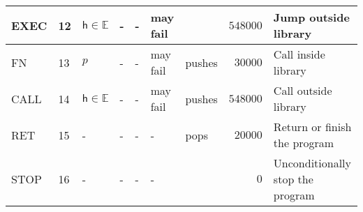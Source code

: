 \documentclass[9pt,oneside]{amsart}
\begin{document}
\begin{table}[h]
\begin{tabular}{l p{1cm} l p{1cm} p{1cm} p{1.5cm} p{1cm} r p{5cm}}
EXEC	&12	&$\mathsf{h} \in \mathbb{E}$ &-	&-                              &may fail	& 	    &$548000$ &Jump outside library \\ \midrule
FN  	&13	&$p$	&-		        &-                              &may fail	&pushes &$30000$  &Call inside library \\ \midrule
CALL	&14	&$\mathsf{h} \in \mathbb{E}$	&-		        &-                              &may fail	&pushes	&$548000$ &Call outside library \\ \midrule
RET 	&15	&-  	&-		        &-                              &-	      	&pops   &$20000$  &Return or finish the program \\ \midrule
STOP	&16	&-  	&-		        &-                              &-	      	&       &$0$      &Unconditionally stop the program \\
\bottomrule
\end{tabular}
\end{table}



\newpage
\end{document}

